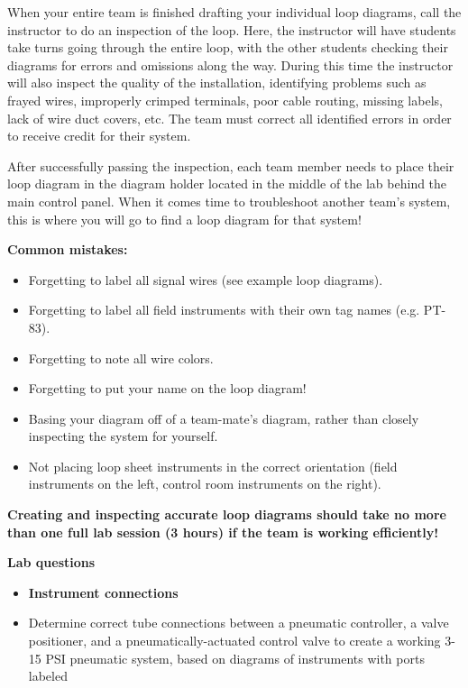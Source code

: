 When your entire team is finished drafting your individual loop diagrams, call the instructor to do an inspection of the loop.  Here, the instructor will have students take turns going through the entire loop, with the other students checking their diagrams for errors and omissions along the way.  During this time the instructor will also inspect the quality of the installation, identifying problems such as frayed wires, improperly crimped terminals, poor cable routing, missing labels, lack of wire duct covers, etc.  The team must correct all identified errors in order to receive credit for their system.  

After successfully passing the inspection, each team member needs to place their loop diagram in the diagram holder located in the middle of the lab behind the main control panel.  When it comes time to troubleshoot another team's system, this is where you will go to find a loop diagram for that system!

\vskip 10pt

{\bf Common mistakes:}

\begin{itemize}
\item{} Forgetting to label all signal wires (see example loop diagrams).
\item{} Forgetting to label all field instruments with their own tag names (e.g. PT-83).
\item{} Forgetting to note all wire colors.
\item{} Forgetting to put your name on the loop diagram!
\item{} Basing your diagram off of a team-mate's diagram, rather than closely inspecting the system for yourself.
\item{} Not placing loop sheet instruments in the correct orientation (field instruments on the left, control room instruments on the right).
\end{itemize}

\vskip 10pt

{\bf Creating and inspecting accurate loop diagrams should take no more than one full lab session (3 hours) if the team is working efficiently!}








\vfil \eject

\noindent
{\bf Lab questions}

\vskip 5pt

\begin{itemize}
\item{} {\bf Instrument connections}
\item{} Determine correct tube connections between a pneumatic controller, a valve positioner, and a pneumatically-actuated control valve to create a working 3-15 PSI pneumatic system, based on diagrams of instruments with ports labeled
\end{itemize}

